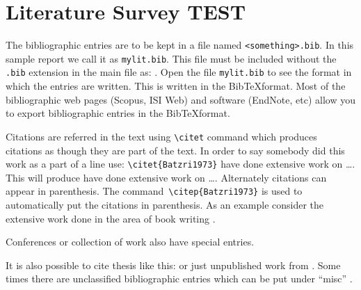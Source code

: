 
\chapter{Literature Survey TEST}

The bibliographic entries are to be kept in a file named
\verb|<something>.bib|. In this sample report we call it as
\verb|mylit.bib|. This file must be included without the \verb|.bib|
extension in the main file as: \verb||.   Open the
file \verb|mylit.bib| to see the format in which the entries are
written. This is written in the Bib\TeX format. Most of the
bibliographic web pages (Scopus, ISI Web) and software (EndNote, etc)
allow you to export bibliographic entries in the Bib\TeX format.

Citations are referred in the text using \verb|\citet| command which produces citations as though they are part of the text.  In order to say
somebody did this work as a part of a line use:
\verb|\citet{Batzri1973}| have done extensive work on \ldots.  This will produce
\citet{Batzri1973} have done extensive work on \ldots. Alternately citations can appear in parenthesis.  
The command~\verb|\citep{Batzri1973}| is used to automatically put the
citations in parenthesis.  As an example consider the extensive work
done in the area of book writing \citep{Sackmann1995a,Boal2012}.

Conferences \citep{rich-mart92} or collection of work
\citep{Sackmann1995a} also have special entries.

It is also possible to cite thesis like this:
\citet{jariwala00,luding94} or just unpublished work from
\citet{SunHI03}. Some times there are unclassified bibliographic
entries which can be put under ``misc'' \citep{Smith99}.



